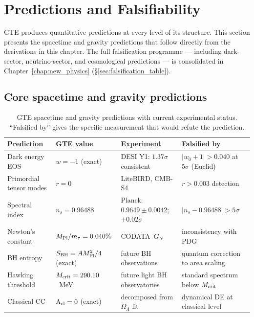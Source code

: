 \documentclass[11pt,openany]{book}
\theoremstyle{remark}
\newcommand{\mtau}{m_\tau}
\newcommand{\MPl}{M_{\rm Pl}}
\newcommand{\GN}{G_N}
\begin{document}
\section{Predictions and Falsifiability}
\label{sec:falsifiability}

GTE produces quantitative predictions at every level of its structure.
This section presents the spacetime and gravity predictions that follow directly
from the derivations in this chapter.
The full falsification programme --- including dark-sector, neutrino-sector, and
cosmological predictions --- is consolidated in
Chapter~\ref{chap:new_physics} (\S\ref{sec:falsification_table}).

\subsection*{Core spacetime and gravity predictions}

\begin{table}[htbp]
\centering
\caption{GTE spacetime and gravity predictions with current experimental status.
``Falsified by'' gives the specific measurement that would refute the prediction.}
\label{tab:spacetime_predictions}
\renewcommand{\arraystretch}{1.25}
\begin{tabular}{P{3.6cm}P{2.8cm}P{2.8cm}P{3.0cm}}
\toprule
Prediction & GTE value & Experiment & Falsified by \\
\midrule
Dark energy EOS
  & $w = -1$ (exact)
  & DESI Y1: $1.37\sigma$ consistent
  & $|w_0+1| > 0.040$ at $5\sigma$ (Euclid) \\
Primordial tensor modes
  & $r = 0$
  & LiteBIRD, CMB-S4
  & $r > 0.003$ detection \\
Spectral index
  & $n_s = 0.96488$
  & Planck: $0.9649\pm0.0042$; $+0.02\sigma$
  & $|n_s - 0.96488| > 5\sigma$ \\
Newton's constant
  & $\MPl/\mtau = 0.040\%$
  & CODATA~$\GN$
  & inconsistency with PDG \\
BH entropy
  & $S_{\rm BH} = AM_{\rm Pl}^2/4$ (exact)
  & future BH observations
  & quantum correction to area scaling \\
Hawking threshold
  & $M_{\rm crit} = 290.10$~MeV
  & future light BH observatories
  & standard spectrum below $M_{\rm crit}$ \\
Classical CC
  & $\Lambda_{\rm cl} = 0$ (exact)
  & decomposed from $\Omega_\Lambda$ fit
  & dynamical DE at classical level \\
\bottomrule
\end{tabular}
\end{table}
\end{document}
